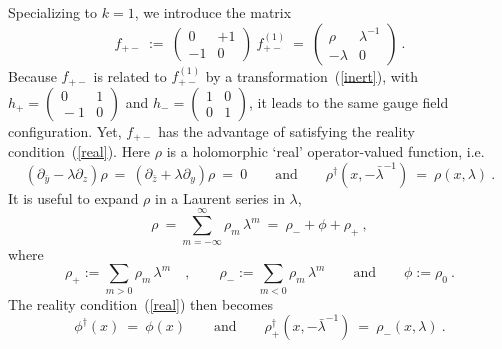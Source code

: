 \documentclass[a4paper,11pt]{article}
\numberwithin{equation}{section}
\def\l{\lambda}
\def\r{\rho}
\def\pa{\mbox{$\partial$}}
\def\+{\dagger}
\begin{document}
Specializing to $k=1$, we introduce the matrix
\begin{equation}\label{AW1}
f_{+-}\ :=\ 
\left(\begin{smallmatrix} 0 & +1 \\[4pt] -1 & 0 \end{smallmatrix}\right)\
f^{(1)}_{+-}\ =\ 
\begin{pmatrix} \r & {\l}^{-1} \\ -\l & 0 \end{pmatrix}\ .
\end{equation}
Because $f_{+-}$ is related to $f^{(1)}_{+-}$ 
by a transformation~(\ref{inert}), 
with $h_+=(\begin{smallmatrix} 0&1\\ \!{-}1&0 \end{smallmatrix})$
and  $h_-=(\begin{smallmatrix} 1&0\\0&1 \end{smallmatrix})$,
it leads to the same gauge field configuration.  Yet, 
$f_{+-}$ has the advantage of satisfying the reality condition~(\ref{real}). 
Here $\r$ is a holomorphic `real' operator-valued function, i.e.
\begin{equation}\label{rho}
(\pa_{\bar y}-\l\pa_z)\r\ =\ (\pa_{\bar z}+\l\pa_y)\r\ =\ 0 
\qquad\textrm{and}\qquad
\r^\+(x,-\bar\l^{-1})\ =\ \r(x,\l)\ .
\end{equation}
It is useful to expand $\r$ in a Laurent series in $\l$,
\begin{equation}\label{sum}
\r\ = \sum\limits^\infty_{m=-\infty}\r_m\,\l^m\ =\ \r_-+\phi +\r_+\ ,
\end{equation}
where
\begin{equation}
\r_+:=\sum\limits_{m >0}\r_m\,\l^m \quad ,\qquad 
\r_-:=\sum\limits_{m <0}\r_m\,\l^m \qquad\textrm{and}\qquad 
\phi:=\r_0\ .
\end{equation}
The reality condition~(\ref{real}) then becomes
\begin{equation}
\phi^\+(x)\ =\ \phi (x) \qquad\mbox{and}\qquad
\r_+^\+(x, -{\bar\l}^{-1})\ =\ \r_-(x,\l ) \ .
\end{equation}
\end{document}
